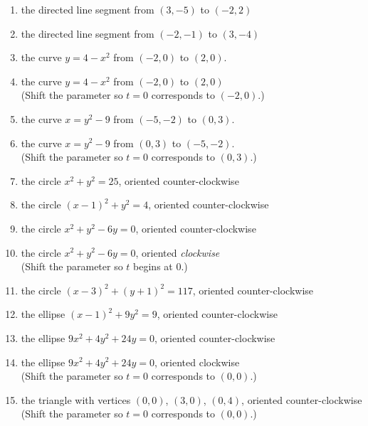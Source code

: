 \documentclass{ximera}
\begin{document}
\begin{enumerate}

\setcounter{enumi}{\value{HW}}

\item  the directed line segment from $(3,-5)$ to $(-2,2)$ \label{findparamfirst}

\item  the directed line segment from $(-2,-1)$ to $(3, -4)$ 

\item  the curve $y = 4-x^2$ from $(-2,0)$ to $(2,0)$.

\item   the curve $y = 4-x^2$ from $(-2,0)$ to $(2,0)$ \\
(Shift the parameter so  $t=0$ corresponds to $(-2,0)$.)

\item  the curve $x = y^2 - 9$ from $(-5,-2)$ to $(0,3)$.

\item  the curve $x = y^2 - 9$ from $(0,3)$ to $(-5,-2)$.\\
(Shift the parameter so  $t=0$ corresponds to $(0,3)$.)

\item   the circle $x^2 + y^2 = 25$, oriented counter-clockwise

\item   the circle $(x-1)^2 + y^2 = 4$, oriented counter-clockwise

\item   the circle $x^2 + y^2 - 6y = 0$, oriented counter-clockwise

\item   the circle $x^2 + y^2 - 6y = 0$, oriented \emph{clockwise}\\
(Shift the parameter so  $t$ begins at $0$.)

\item   the circle $(x-3)^2 + (y+1)^2 = 117$, oriented counter-clockwise

\item   the ellipse $(x-1)^2 + 9y^2 = 9$, oriented counter-clockwise

\item   the ellipse $9x^2 + 4y^2 + 24y =0$, oriented counter-clockwise

\item   the ellipse $9x^2 + 4y^2 + 24y =0$, oriented clockwise  \\
(Shift the parameter so $t=0$ corresponds to  $(0,0)$.)

\item  the triangle with vertices $(0,0)$, $(3,0)$, $(0,4)$, oriented counter-clockwise \\
(Shift the parameter so $t=0$ corresponds to $(0,0)$.) \label{findparamlast}

\setcounter{HW}{\value{enumi}}

\end{enumerate}
\end{document}
